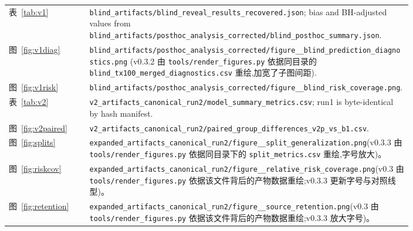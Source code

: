 \documentclass[11pt,a4paper]{ctexart}
\begin{document}
{\begin{longtable}{lp{0.80\linewidth}}
表~\ref{tab:v1} & \texttt{blind\_\allowbreak artifacts/\allowbreak blind\_\allowbreak reveal\_\allowbreak results\_\allowbreak recovered.json}; bias and BH-adjusted values from \texttt{blind\_\allowbreak artifacts/\allowbreak posthoc\_\allowbreak analysis\_\allowbreak corrected/\allowbreak blind\_\allowbreak posthoc\_\allowbreak summary.json}. \\
图~\ref{fig:v1diag} & \texttt{blind\_\allowbreak artifacts/\allowbreak posthoc\_\allowbreak analysis\_\allowbreak corrected/\allowbreak figure\_\allowbreak 1\_\allowbreak blind\_\allowbreak prediction\_\allowbreak diagnostics.png} (v0.3.2 由 \texttt{tools/\allowbreak render\_\allowbreak figures.py} 依据同目录的 \texttt{blind\_\allowbreak tx100\_\allowbreak merged\_\allowbreak diagnostics.csv} 重绘,加宽了子图间距). \\
图~\ref{fig:v1risk} & \texttt{blind\_\allowbreak artifacts/\allowbreak posthoc\_\allowbreak analysis\_\allowbreak corrected/\allowbreak figure\_\allowbreak 2\_\allowbreak blind\_\allowbreak risk\_\allowbreak coverage.png}. \\
表~\ref{tab:v2} & \texttt{v2\_\allowbreak artifacts\_\allowbreak canonical\_\allowbreak run2/\allowbreak model\_\allowbreak summary\_\allowbreak metrics.csv}; run1 is byte-identical by hash manifest. \\
图~\ref{fig:v2paired} & \texttt{v2\_\allowbreak artifacts\_\allowbreak canonical\_\allowbreak run2/\allowbreak paired\_\allowbreak group\_\allowbreak differences\_\allowbreak v2p\_\allowbreak vs\_\allowbreak b1.csv}. \\
图~\ref{fig:splits} & \texttt{expanded\_\allowbreak artifacts\_\allowbreak canonical\_\allowbreak run2/\allowbreak figure\_\allowbreak 1\_\allowbreak split\_\allowbreak generalization.png}(v0.3.3 由 \texttt{tools/\allowbreak render\_\allowbreak figures.py} 依据同目录下的 \texttt{split\_\allowbreak metrics.csv} 重绘,字号放大)。 \\
图~\ref{fig:riskcov} & \texttt{expanded\_\allowbreak artifacts\_\allowbreak canonical\_\allowbreak run2/\allowbreak figure\_\allowbreak 3\_\allowbreak relative\_\allowbreak risk\_\allowbreak coverage.png}(v0.3 由 \texttt{tools/\allowbreak render\_\allowbreak figures.py} 依据该文件背后的产物数据重绘;v0.3.3 更新字号与对照线型)。 \\
图~\ref{fig:retention} & \texttt{expanded\_\allowbreak artifacts\_\allowbreak canonical\_\allowbreak run2/\allowbreak figure\_\allowbreak 4\_\allowbreak source\_\allowbreak retention.png}(v0.3 由 \texttt{tools/\allowbreak render\_\allowbreak figures.py} 依据该文件背后的产物数据重绘;v0.3.3 放大字号)。 \\

\end{longtable}}
\end{document}
